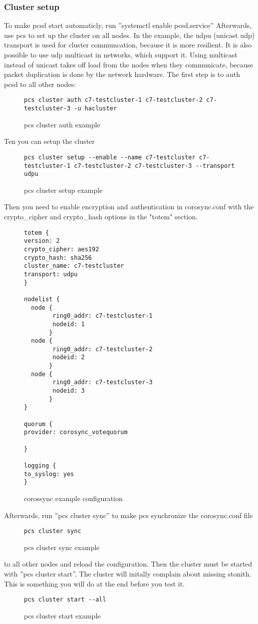 \subsubsection{Cluster setup}
To make pcsd start automaticly, run ''systemctl enable pcsd.service''
Afterwards, use pcs to set up the cluster on all nodes. 
In the example, the udpu (unicast udp) transport is used for cluster communcation, because it is more resilient.
It is also possible to use udp multicast in networks, which support it. Using multicast
instead of unicast takes off load from the nodes when they communicate, because packet duplication is done by the network hardware.
The first step is to auth pcsd to all other nodes:
\begin{figure}
\begin{lstlisting}
pcs cluster auth c7-testcluster-1 c7-testcluster-2 c7-testcluster-3 -u hacluster
\end{lstlisting}
\caption{pcs cluster auth example}
\end{figure}
Ten you can setup the cluster
\begin{figure}
\begin{lstlisting}
pcs cluster setup --enable --name c7-testcluster c7-testcluster-1 c7-testcluster-2 c7-testcluster-3 --transport udpu
\end{lstlisting}
\caption{pcs cluster setup example}
\end{figure}
Then you need to enable encryption and authentication in corosync.conf with the crypto\_cipher and crypto\_hash
options in the "totem" section.
\begin{figure}
\begin{lstlisting}
totem {
version: 2
crypto_cipher: aes192
crypto_hash: sha256
cluster_name: c7-testcluster
transport: udpu
}

nodelist {
  node {
        ring0_addr: c7-testcluster-1
        nodeid: 1
       }
  node {
        ring0_addr: c7-testcluster-2
        nodeid: 2
       }
  node {
        ring0_addr: c7-testcluster-3
        nodeid: 3
       }
}

quorum {
provider: corosync_votequorum

}

logging {
to_syslog: yes
}
\end{lstlisting}
\caption{corossync example configuration}
\end{figure}
Afterwards, run ''pcs cluster sync'' to make pcs synchronize the corosync.conf file
\begin{figure}
\begin{lstlisting}
pcs cluster sync
\end{lstlisting}
\caption{pcs cluster sync example}
\end{figure}
to all other nodes and reload the configuration.
Then the cluster must be started with ''pcs cluster start''.
The cluster will initally complain about missing stonith. This is something you will do at the end
before you test it.
\begin{figure}
\begin{lstlisting}
pcs cluster start --all
\end{lstlisting}
\caption{pcs cluster start example}
\end{figure}
